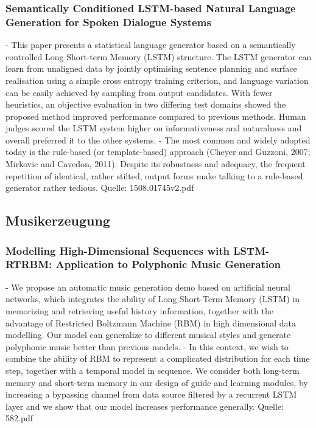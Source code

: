 {\subsubsection{Semantically Conditioned LSTM-based Natural Language Generation for Spoken Dialogue Systems}
- This paper presents a statistical language generator based on a semantically controlled Long Short-term Memory (LSTM) structure. The LSTM generator can learn from unaligned data by jointly optimising sentence planning and surface realisation using a simple cross entropy training criterion, and language variation can be easily achieved by sampling from output candidates. With fewer heuristics, an objective evaluation in two differing test domains showed the proposed method improved performance compared to previous methods. Human judges scored the LSTM system higher on informativeness and naturalness and overall preferred it to the other systems.
- The most common and widely adopted today is the rule-based (or template-based) approach (Cheyer and Guzzoni, 2007; Mirkovic and Cavedon, 2011). Despite its robustness and adequacy, the frequent repetition of identical, rather stilted, output forms make talking to a rule-based generator rather tedious.
Quelle: 1508.01745v2.pdf

\subsection{Musikerzeugung}

\subsubsection{Modelling High-Dimensional Sequences with LSTM-RTRBM: Application to Polyphonic Music Generation}
- We propose an automatic music generation demo based on artificial neural networks, which integrates the ability of Long Short-Term Memory (LSTM) in memorizing and retrieving useful history information, together with the advantage of Restricted Boltzmann Machine (RBM) in high dimensional data modelling. Our model can generalize to different musical styles and generate polyphonic music better than previous models.
- In this context, we wish to combine the ability of RBM to represent a complicated distribution for each time step, together with a temporal model in sequence. We consider both long-term memory and short-term memory in our design of guide and learning modules, by increasing a bypassing channel from data source filtered by a recurrent LSTM layer and we show that our model increases performance generally.
Quelle: 582.pdf

}
